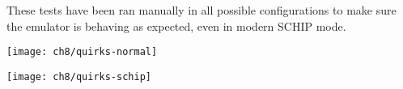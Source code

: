 \clearpage

\par These tests have been ran manually in all possible configurations to make sure the emulator is behaving as expected, even in modern SCHIP mode.\\

\begin{minipage}{\linewidth}
\texttt{[image: ch8/quirks-normal]}
\end{minipage}

\begin{minipage}{\linewidth}
\texttt{[image: ch8/quirks-schip]}
\centering
{}
\end{minipage}